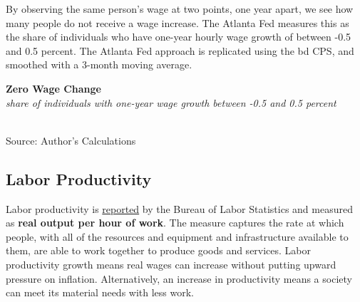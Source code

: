 \documentclass{report}
\makeatletter
\newcommand{\tbllink}[1]{\href{https://raw.githubusercontent.com/bdecon/US-chartbook/master/chartbook/data/#1}{\faTable}}
\newcommand*\short[1]{\expandafter\@gobbletwo\number\numexpr#1\relax}
\newcommand{\dateaxisticks}{
		date coordinates in=x, axis line style={draw=none},
		xmax={2023-10-01},
		max space between ticks=40,	    
		xtick={{1990-01-01}, {1992-01-01}, {1994-01-01}, 
			{1996-01-01}, {1998-01-01}, {2000-01-01}, 
			{2002-01-01}, {2004-01-01}, {2006-01-01},
			{2008-01-01}, {2010-01-01}, {2012-01-01}, {2014-01-01},
		    {2016-01-01}, {2018-01-01}, {2020-01-01}, {2022-01-01}, 
		    {2024-01-01}, {2026-01-01}},
		minor xtick={{1989-01-01}, {1991-01-01}, {1993-01-01},
			{1995-01-01}, {1997-01-01}, {1999-01-01}, 
			{2001-01-01}, {2003-01-01}, {2005-01-01}, {2007-01-01},
		    {2009-01-01}, {2011-01-01}, {2013-01-01}, {2015-01-01},
		    {2017-01-01}, {2019-01-01}, {2021-01-01}, {2023-01-01}, 
		    {2025-01-01}, {2027-01-01}},
		enlarge y limits={0.06}, enlarge x limits={0.01},
		}
\newcommand{\bbar}[2]{extra #1 ticks = {{#2}}, extra #1 tick labels = ,
		extra #1 tick style = {grid=major, grid style={thick, black!25}},}
\newcommand{\stdline}[4]{\addplot[very thick, no markers, color=#1] 
		table [x=#2, y=#3, col sep=comma] {#4};	}
\newcommand{\rebars}{
		\fill[color=black!10] (axis cs:{2007-12-01},\pgfkeysvalueof{/pgfplots/ymin}) rectangle 
			(axis cs:{2009-07-01}, \pgfkeysvalueof{/pgfplots/ymax});
		\fill[color=black!10] (axis cs:{2001-03-01},\pgfkeysvalueof{/pgfplots/ymin}) rectangle 
			(axis cs:{2001-11-01}, \pgfkeysvalueof{/pgfplots/ymax});
		\fill[color=black!10] (axis cs:{2020-02-01},\pgfkeysvalueof{/pgfplots/ymin}) rectangle 
			(axis cs:{2020-05-01}, \pgfkeysvalueof{/pgfplots/ymax});}
\makeatother
\begin{document}
{\begin{minipage}{0.76\textwidth}
\small By observing the same person's wage at two points, one year apart, we see how many people do not receive a wage increase. The Atlanta Fed measures this as the share of individuals who have one-year hourly wage growth of between -0.5 and 0.5 percent. The Atlanta Fed approach is replicated using the bd CPS, and smoothed with a 3-month moving average. 


\vspace{1mm}

\normalsize \textbf{Zero Wage Change}\\
\footnotesize{\textit{share of individuals with one-year wage growth between -0.5 and 0.5 percent}}\\
\hspace*{-2mm} \\
\footnotesize{Source: Author's Calculations} \hfill \tbllink{atl_wgt.csv}
\end{minipage}
\newpage
\vspace*{-10mm}

\begin{minipage}{0.76\textwidth}
\subsection*{Labor Productivity}
\hypertarget{labprod}{\label{labprod}}
\small Labor productivity is \href{https://www.bls.gov/news.release/prod2.nr0.htm}{reported} by the Bureau of Labor Statistics and measured as \textbf{real output per hour of work}. The measure captures the rate at which people, with all of the resources and equipment and infrastructure available to them, are able to work together to produce goods and services. Labor productivity growth means real wages can increase without putting upward pressure on inflation. Alternatively, an increase in productivity means a society can meet its material needs with less work.
\vspace{1mm}


\end{minipage}}
\end{document}
